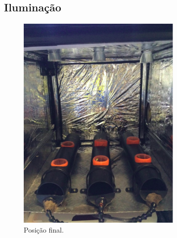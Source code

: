 \newpage

\subsection{Iluminação}

\begin{figure}[H]
	\centering
	\includegraphics[width=8cm]{figuras/iluminaEstufa.png}
	\caption{Posição final.}
	\label{iluminaEstufa}
\end{figure}
